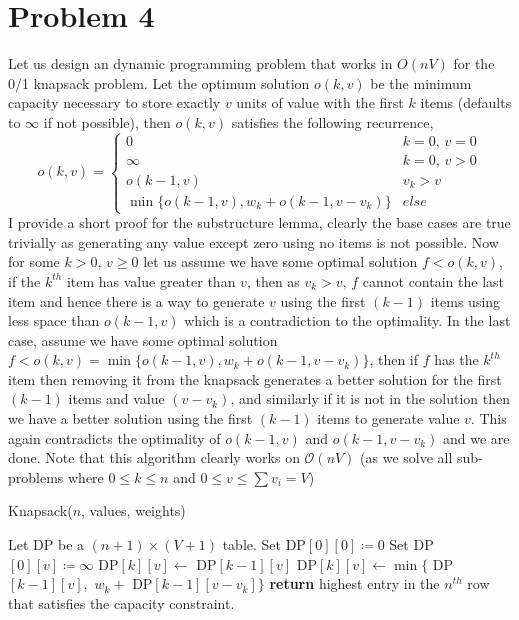 \documentclass{article}
\numberwithin{equation}{section}
\numberwithin{theorem}{section}
\numberwithin{lemma}{section}
\newcommand{\bigOh}[1]{\mathcal{O}\left(#1\right)}
\begin{document}
\section{Problem 4}
Let us design an dynamic programming problem that works in $O(nV)$ for the 0/1 knapsack problem. Let the optimum solution $o(k, v)$ be the minimum capacity necessary to store exactly $v$ units of value with the first $k$ items (defaults to $\infty$ if not possible), then $o(k, v)$ satisfies the following recurrence, 
\begin{equation}
    o(k, v) = \begin{cases}
        0& k=0, \, v = 0\\
        \infty& k=0, \, v>0\\
        o(k-1, v)& v_k > v\\
        \min\{o(k-1, v), w_k + o(k-1, v-v_k)\} & else
    \end{cases}
\end{equation}
I provide a short proof for the substructure lemma, clearly the base cases are true trivially as generating any value except zero using no items is not possible. Now for some $k>0, \, v\geq 0$ let us assume we have some optimal solution $f < o(k, v)$, if the $k^{th}$ item has value greater than $v$, then as $v_k > v$, $f$ cannot contain the last item and hence there is a way to generate $v$ using the first $(k-1)$ items using less space than $o(k-1, v)$ which is a contradiction to the optimality. In the last case, assume we have some optimal solution $f < o(k, v) = \min\{o(k-1, v), w_k + o(k-1, v-v_k)\}$, then if $f$ has the $k^{th}$ item then removing it from the knapsack generates a better solution for the first $(k-1)$ items and value $(v-v_k)$, and similarly if it is not in the solution then we have a better solution using the first $(k-1)$ items to generate value $v$. This again contradicts the optimality of $o(k-1, v)$ and $o(k-1, v-v_k)$ and we are done. Note that this algorithm clearly works on $\bigOh{nV}$ (as we solve all sub-problems where $ 0\le k\le n$ and $0\le v\le \sum v_i = V$) 
\begin{algorithm}
    \caption{Knapsack($n$, values, weights)}
    \begin{algorithmic}[1]
        \State Let DP be a $(n+1) \times (V+1)$ table. 
        \State Set DP$[0][0] \coloneqq 0$
            \State Set  DP$[0][v] \coloneqq \infty$
        \EndFor
                    \State DP$[k][v] \leftarrow $  DP$[k-1][v]$
                \Else
                    \State DP$[k][v] \leftarrow \min \{$  DP$[k-1][v],$ $w_k+$ DP$[k-1][v-v_k]\}$
                \EndIf
            \EndFor
        \EndFor
        \State \textbf{return} highest entry in the $n^{th}$ row that satisfies the capacity constraint. 
    \end{algorithmic}
\end{algorithm}
\end{document}
